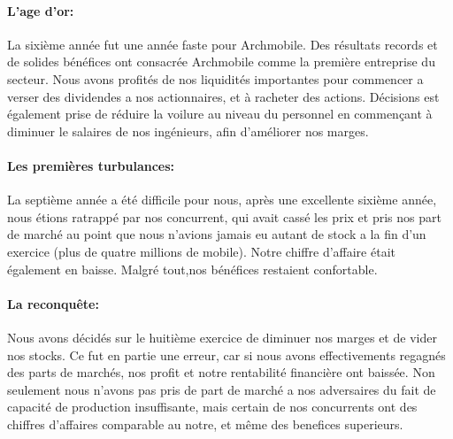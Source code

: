 \paragraph{L'age d'or:}

La sixième année fut une année faste pour Archmobile. Des résultats
records et de solides bénéfices ont consacrée Archmobile comme la
première entreprise du secteur. Nous avons profités de nos liquidités
importantes pour commencer a verser des dividendes a nos actionnaires,
et à racheter des actions. Décisions est également prise de réduire la
voilure au niveau du personnel en commençant à diminuer le salaires de
nos ingénieurs, afin d'améliorer nos marges.

\paragraph{Les premières turbulances:}

La septième année a été difficile pour nous, après une excellente
sixième année, nous étions ratrappé par nos concurrent, qui avait
cassé les prix et pris nos part de marché au point que nous n'avions
jamais eu autant de stock a la fin d'un exercice (plus de quatre
millions de mobile). Notre chiffre d'affaire était également en baisse.
Malgré tout,nos bénéfices restaient confortable.

\paragraph{La reconquête:}
 
Nous avons décidés sur le huitième exercice de diminuer nos marges et
de vider nos stocks.  Ce fut en partie une erreur, car si nous avons
effectivements regagnés des parts de marchés, nos profit et notre
rentabilité financière ont baissée. Non seulement nous n'avons pas
pris de part de marché a nos adversaires du fait de capacité de
production insuffisante, mais certain de nos concurrents ont des chiffres d'affaires 
comparable au notre, et même des benefices superieurs. 

